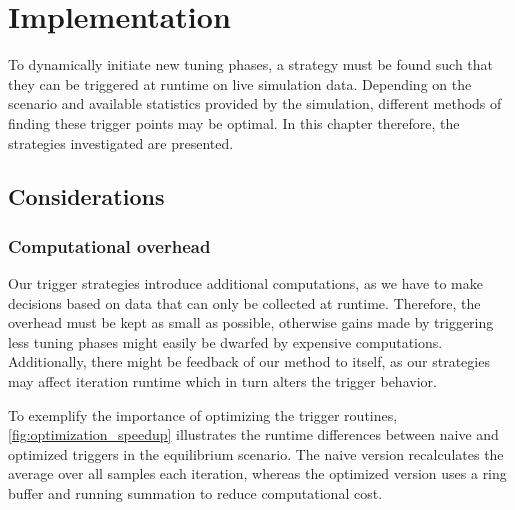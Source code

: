 \chapter[Implementation]{Implementation}
\label{cp:implementation}

{
	\parindent0pt
	To dynamically initiate new tuning phases, a strategy must be found such that they can be triggered at runtime on live simulation data. Depending on the scenario and available statistics provided by the simulation, different methods of finding these trigger points may be optimal. In this chapter therefore, the strategies investigated are presented.
}

\section{Considerations}
\subsection{Computational overhead}
Our trigger strategies introduce additional computations, as we have to make decisions based on data that can only be collected at runtime. Therefore, the overhead must be kept as small as possible, otherwise gains made by triggering less tuning phases might easily be dwarfed by expensive computations. Additionally, there might be feedback of our method to itself, as our strategies may affect iteration runtime which in turn alters the trigger behavior.

To exemplify the importance of optimizing the trigger routines, \autoref{fig:optimization_speedup} illustrates the runtime differences between naive and optimized triggers in the equilibrium scenario. The naive version recalculates the average over all samples each iteration, whereas the optimized version uses a ring buffer and running summation to reduce computational cost. 


